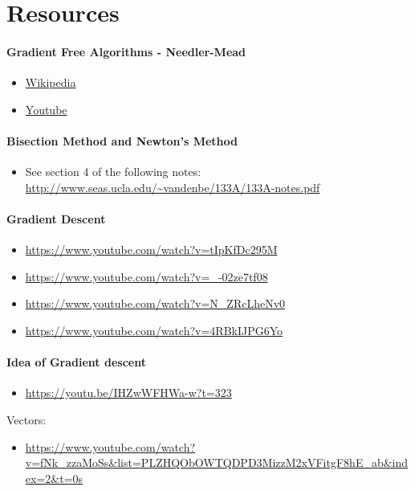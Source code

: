  







\section{Resources}


\begin{resource}
\paragraph{Gradient Free Algorithms - Needler-Mead}
\begin{itemize}
\item \href{https://en.wikipedia.org/wiki/Nelder%E2%80%93Mead_method}{Wikipedia}\\
\item \href{https://youtube/NI3WllrvWoc?t=96}{Youtube}
\end{itemize}
\paragraph{Bisection Method and Newton's Method}
\begin{itemize}
\item See section 4 of the following notes:
\url{http://www.seas.ucla.edu/~vandenbe/133A/133A-notes.pdf}
\end{itemize}
\paragraph{Gradient Descent}
\begin{itemize}
\item \url{https://www.youtube.com/watch?v=tIpKfDc295M}

\item \url{https://www.youtube.com/watch?v=_-02ze7tf08}

\item \url{https://www.youtube.com/watch?v=N_ZRcLheNv0}

\item \url{https://www.youtube.com/watch?v=4RBkIJPG6Yo}
\end{itemize}
\paragraph{Idea of Gradient descent}
\begin{itemize}
\item \url{https://youtu.be/IHZwWFHWa-w?t=323}
\end{itemize}
Vectors:\\
\begin{itemize}
\item \url{https://www.youtube.com/watch?v=fNk_zzaMoSs&list=PLZHQObOWTQDPD3MizzM2xVFitgF8hE_ab&index=2&t=0s}
\end{itemize}
\end{resource}






